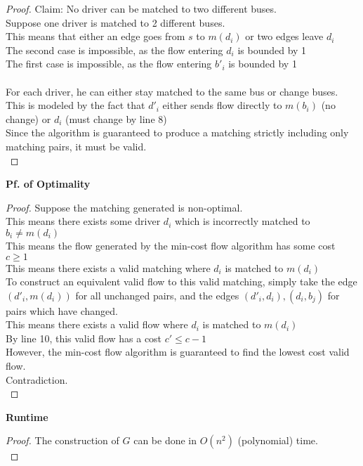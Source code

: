 \begin{problem}
\begin{proof}
        Claim: No driver can be matched to two different buses. \\
        Suppose one driver is matched to 2 different buses. \\
        This means that either an edge goes from $s$ to $m(d_i)$ or two edges leave $d_i$ \\
        The second case is impossible, as the flow entering $d_i$ is bounded by 1 \\
        The first case is impossible, as the flow entering $b'_i$ is bounded by 1 \\\\
        For each driver, he can either stay matched to the same bus or change buses. \\
        This is modeled by the fact that $d'_i$ either sends flow directly to $m(b_i)$ (no change) or $d_i$ (must change by line 8) \\
        Since the algorithm is guaranteed to produce a matching strictly including only matching pairs, it must be valid. \\
    \end{proof}
    \textbf{Pf. of Optimality}
    \begin{proof}
        Suppose the matching generated is non-optimal. \\
        This means there exists some driver $d_i$ which is incorrectly matched to $b_i \neq m(d_i)$ \\
        This means the flow generated by the min-cost flow algorithm has some cost $c \geq 1$ \\
        This means there exists a valid matching where $d_i$ is matched to $m(d_i)$ \\
        To construct an equivalent valid flow to this valid matching, simply take the edge $(d'_i, m(d_i))$ for all unchanged pairs,
        and the edges $(d'_i, d_i), (d_i, b_j)$ for pairs which have changed. \\
        This means there exists a valid flow where $d_i$ is matched to $m(d_i)$ \\
        By line 10, this valid flow has a cost $c' \leq c - 1$ \\
        However, the min-cost flow algorithm is guaranteed to find the lowest cost valid flow. \\
        Contradiction. \\
    \end{proof}
    \noindent
    \textbf{Runtime}
    \begin{proof}
        The construction of $G$ can be done in $O(n^2)$ (polynomial) time. \\

\end{proof}
\end{problem}
